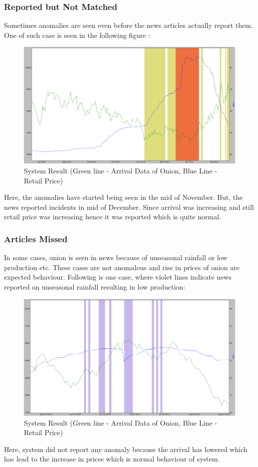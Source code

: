 \documentclass[a4paper,10pt]{article}
\begin{document}
\subsubsection{Reported but Not Matched}
Sometimes anomalies are seen even before the news articles actually report them. One of such case is seen in the following figure :
\begin{figure}[H]
\centering
\includegraphics[width=1.1\textwidth]{graphs/ReportedNotMatched.png}
\caption{System Result (Green line - Arrival Data of Onion, Blue Line - Retail Price)}
\label{fig:localExample}
\end{figure}

Here, the anomalies have started being seen in the mid of November. But, the news reported incidents in mid of December.  Since arrival was increasing and still retail price was increasing hence it was reported which is quite normal.

\subsubsection{Articles Missed}
In some cases, onion is seen in news because of unseasonal rainfall or low production etc. These cases are not anomalous and rise in prices of onion are expected behaviour. Following is one case, where violet lines indicate news reported on unseasonal rainfall resulting in low production:

\begin{figure}[H]
\centering
\includegraphics[width=1.1\textwidth]{graphs/MissedAnomaly.png}
\caption{System Result (Green line - Arrival Data of Onion, Blue Line - Retail Price)}
\label{fig:localExample}
\end{figure}

Here, system did not report any anomaly because the arrival has lowered which has lead to the increase in prices which is normal behaviour of system. 
\end{document}
